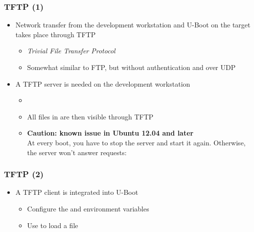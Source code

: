 \begin{frame}
  \frametitle{TFTP (1)}
  \begin{itemize}
  \item Network transfer from the development workstation and U-Boot
    on the target takes place through TFTP
    \begin{itemize}
    \item {\em Trivial File Transfer Protocol}
    \item Somewhat similar to FTP, but without authentication and over
      UDP
    \end{itemize}
  \item A TFTP server is needed on the development workstation
    \begin{itemize}
    \item {}
    \item All files in  are then visible
      through TFTP
    \item {\bf Caution: known issue in Ubuntu 12.04 and later}\\
	At every boot, you have to stop the server and start it again.
	Otherwise, the server won't answer requests:\\
    \end{itemize}
  \end{itemize}
\end{frame}

\begin{frame}
  \frametitle{TFTP (2)}
  \begin{itemize}
  \item A TFTP client is integrated into U-Boot
    \begin{itemize}
    \item Configure the  and  environment
      variables
    \item Use  to load a file
    \end{itemize}
  \end{itemize}
\end{frame}

